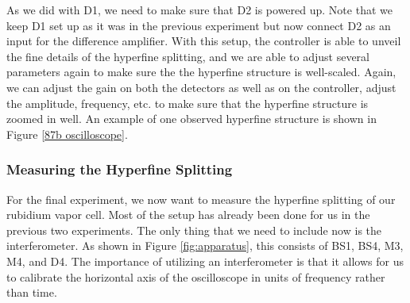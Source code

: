 \documentclass[twocolumn,amsmath,amssymb,pra, floatfix]{revtex4-2}
\begin{document}
As we did with D1, we need to make sure that D2 is powered up. Note that we keep D1 set up as it was in the previous experiment but now connect D2 as an input for the difference amplifier. With this setup, the controller is able to unveil the fine details of the hyperfine splitting, and we are able to adjust several parameters again to make sure the the hyperfine structure is well-scaled. Again, we can adjust the gain on both the detectors as well as on the controller, adjust the amplitude, frequency, etc. to make sure that the hyperfine structure is zoomed in well. An example of one observed hyperfine structure is shown in Figure \ref{87b oscilloscope}. 

\subsubsection{Measuring the Hyperfine Splitting}
\label{sec:measure_hfs}
For the final experiment, we now want to measure the hyperfine splitting of our rubidium vapor cell. Most of the setup has already been done for us in the previous two experiments. The only thing that we need to include now is the interferometer. As shown in Figure \ref{fig:apparatus}, this consists of BS1, BS4, M3, M4, and D4. The importance of utilizing an interferometer is that it allows for us to calibrate the horizontal axis of the oscilloscope in units of frequency rather than time.
\end{document}
